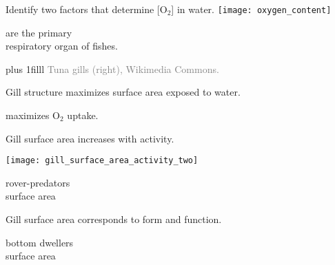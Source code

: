 \documentclass[t,handout]{beamer}  %
\begin{document}
\begin{frame}[t,plain]{Identify two factors that determine [O$_2$] in water.}
	\centering
	\texttt{[image: oxygen\_content]}
\end{frame}

{
\begin{frame}[t,plain]
\hangpara\hspace{17em}  are the primary\\ 
	\hspace{17em} respiratory organ of fishes.

\vskip0pt plus 1filll
\hfill\tiny\textcolor{gray}{Tuna gills (right), Wikimedia Commons.}
\end{frame}
}

{
\begin{frame}[t,plain]{Gill structure maximizes surface area exposed to water.}

\end{frame}
}

{
\begin{frame}[t,plain]{ maximizes O$_2$ uptake.}

\end{frame}
}

{
\begin{frame}[t,plain]{Gill surface area increases with activity.}

\end{frame}
}



\begin{frame}[t,plain]
\begin{minipage}{0.55\textwidth}
	\texttt{[image: gill\_surface\_area\_activity\_two]}
\end{minipage}\hfill
\begin{minipage}{0.40\textwidth}
	\raggedright
	{\parbox{\widthof{active rover-predators}}{\footnotesize{} rover-predators\\ surface area}}

	\vspace{5em}

	{\hangpara\hspace{17em} Gill surface area corresponds to form and function.}

	\vspace{7em}

	{\parbox{\widthof{sluggish rover-predators}}{\footnotesize{} bottom dwellers\\ surface area}}

\end{minipage}
\end{frame}
\end{document}
